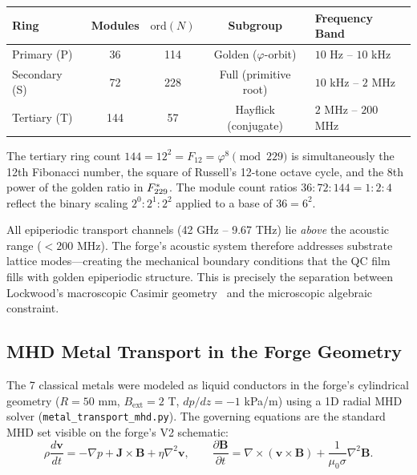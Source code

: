 \begin{center}
\begin{tabular}{@{}lcccl@{}}
\toprule
\textbf{Ring} & \textbf{Modules} & \textbf{$\mathrm{ord}(N)$} & \textbf{Subgroup} & \textbf{Frequency Band} \\
\midrule
Primary (P)   & 36  & 114 & Golden ($\varphi$-orbit)  & $10$ Hz -- $10$ kHz \\
Secondary (S) & 72  & 228 & Full (primitive root)     & $10$ kHz -- $2$ MHz \\
Tertiary (T)  & 144 & 57  & Hayflick (conjugate)     & $2$ MHz -- $200$ MHz \\
\bottomrule
\end{tabular}
\end{center}

\noindent The tertiary ring count $144 = 12^2 = F_{12} = \varphi^8 \pmod{229}$ is simultaneously the 12th Fibonacci number, the square of Russell's 12-tone octave cycle, and the 8th power of the golden ratio in $F_{229}^*$. The module count ratios $36{:}72{:}144 = 1{:}2{:}4$ reflect the binary scaling $2^0{:}2^1{:}2^2$ applied to a base of $36 = 6^2$.

All epiperiodic transport channels (42 GHz -- 9.67 THz) lie \emph{above} the acoustic range ($< 200$ MHz). The forge's acoustic system therefore addresses substrate lattice modes---creating the mechanical boundary conditions that the QC film fills with golden epiperiodic structure. This is precisely the separation between Lockwood's macroscopic Casimir geometry~\cite{lockwood2025zpe} and the microscopic algebraic constraint.

\subsection{MHD Metal Transport in the Forge Geometry}\label{sec:mhd}

The 7 classical metals were modeled as liquid conductors in the forge's cylindrical geometry ($R = 50$ mm, $B_{\mathrm{ext}} = 2$ T, $dp/dz = -1$ kPa/m) using a 1D radial MHD solver (\texttt{metal\_transport\_mhd.py}). The governing equations are the standard MHD set visible on the forge's V2 schematic:
\begin{equation}
    \rho \frac{d\mathbf{v}}{dt} = -\nabla p + \mathbf{J} \times \mathbf{B} + \eta \nabla^2 \mathbf{v}, \qquad
    \frac{\partial \mathbf{B}}{\partial t} = \nabla \times (\mathbf{v} \times \mathbf{B}) + \frac{1}{\mu_0 \sigma} \nabla^2 \mathbf{B}.
\end{equation}

